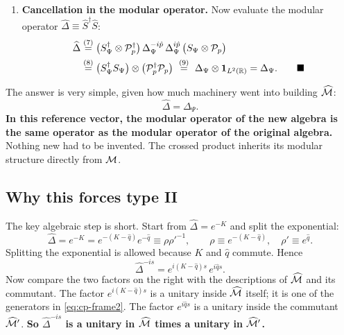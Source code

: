 \begin{keyresult}
\begin{enumerate}[leftmargin=*]
\item \textbf{Cancellation in the modular operator.}
Now evaluate the modular operator $\widehat\Delta \equiv \widehat S^\dagger \widehat S$:
\begin{align}
\widehat\Delta
&\overset{(7)}{=} \big(S_\Psi^\dagger \otimes \mathcal{P}_p^\dagger\big)\,\Delta_\Psi^{-i\hat p}\,\Delta_\Psi^{i\hat p}\,\big(S_\Psi \otimes \mathcal{P}_p\big) \notag\\
&\overset{(8)}{=} \big(S_\Psi^\dagger S_\Psi\big) \otimes \big(\mathcal{P}_p^\dagger \mathcal{P}_p\big)
\ \overset{(9)}{=}\ \Delta_\Psi \otimes \mathbf{1}_{L^2(\mathbb{R})} = \Delta_\Psi . \qquad \blacksquare \notag
\end{align}
\quad
{}\quad
{}
\end{enumerate}
\end{keyresult}

The answer is very simple, given how much machinery went into building $\widehat{\mathcal{M}}$:
\begin{equation}
\widehat\Delta = \Delta_\Psi .
\label{eq:cp-modop}
\end{equation}
\textbf{In this reference vector, the modular operator of the new algebra is the same operator as the modular
operator of the original algebra.} Nothing new had to be invented. The crossed product inherits its modular
structure directly from $\mathcal{M}$.

\subsection*{Why this forces type II}

The key algebraic step is short. Start from $\widehat\Delta=e^{-K}$ and split the exponential:
\begin{equation}
\widehat\Delta = e^{-K} = e^{-(K-\hat q)}e^{-\hat q} \equiv \rho\rho'^{-1}, \qquad
\rho\equiv e^{-(K-\hat q)}, \quad \rho'\equiv e^{\hat q} .
\label{eq:cp-factorization}
\end{equation}
Splitting the exponential is allowed because $K$ and $\hat q$ commute. Hence
\[
\widehat\Delta^{-is} = e^{i(K-\hat q)s}\,e^{i\hat qs} .
\]
Now compare the two factors on the right with the descriptions of $\widehat{\mathcal{M}}$ and its commutant. The factor
$e^{i(K-\hat q)s}$ is a unitary inside $\widehat{\mathcal{M}}$ itself; it is one of the generators in
\eqref{eq:cp-frame2}. The factor $e^{i\hat qs}$ is a unitary inside the commutant $\widehat{\mathcal{M}}'$. \textbf{So
$\widehat\Delta^{-is}$ is a unitary in $\widehat{\mathcal{M}}$ times a unitary in $\widehat{\mathcal{M}}'$.}

